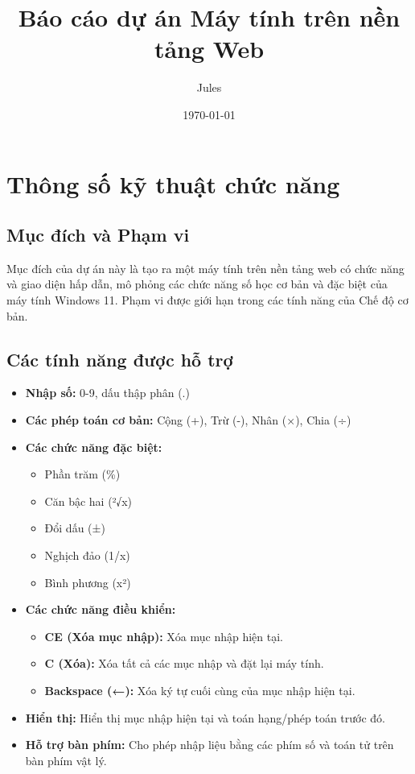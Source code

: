 \documentclass{article}
\title{Báo cáo dự án Máy tính trên nền tảng Web}
\author{Jules}
\date{\today}
\begin{document}
\maketitle
\tableofcontents
\newpage

\section{Thông số kỹ thuật chức năng}

\subsection{Mục đích và Phạm vi}
Mục đích của dự án này là tạo ra một máy tính trên nền tảng web có chức năng và giao diện hấp dẫn, mô phỏng các chức năng số học cơ bản và đặc biệt của máy tính Windows 11. Phạm vi được giới hạn trong các tính năng của Chế độ cơ bản.

\subsection{Các tính năng được hỗ trợ}
\begin{itemize}
    \item \textbf{Nhập số:} 0-9, dấu thập phân (.)
    \item \textbf{Các phép toán cơ bản:} Cộng (+), Trừ (-), Nhân (×), Chia (÷)
    \item \textbf{Các chức năng đặc biệt:}
    \begin{itemize}
        \item Phần trăm (\%)
        \item Căn bậc hai (²√x)
        \item Đổi dấu (±)
        \item Nghịch đảo (1/x)
        \item Bình phương (x²)
    \end{itemize}
    \item \textbf{Các chức năng điều khiển:}
    \begin{itemize}
        \item \textbf{CE (Xóa mục nhập):} Xóa mục nhập hiện tại.
        \item \textbf{C (Xóa):} Xóa tất cả các mục nhập và đặt lại máy tính.
        \item \textbf{Backspace (←):} Xóa ký tự cuối cùng của mục nhập hiện tại.
    \end{itemize}
    \item \textbf{Hiển thị:} Hiển thị mục nhập hiện tại và toán hạng/phép toán trước đó.
    \item \textbf{Hỗ trợ bàn phím:} Cho phép nhập liệu bằng các phím số và toán tử trên bàn phím vật lý.
\end{itemize}
\end{document}
